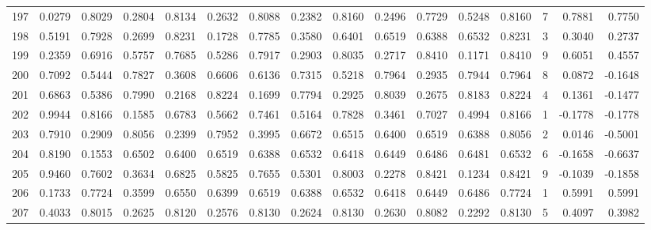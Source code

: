 \begin{tabular}{lrrrrrrrrrrrrrrr}
197 &      0.0279 &  0.8029 &  0.2804 &  0.8134 &  0.2632 &  0.8088 &  0.2382 &  0.8160 &  0.2496 &  0.7729 &   0.5248 &     0.8160 &      7 &                    0.7881 &                     0.7750 \\
198 &      0.5191 &  0.7928 &  0.2699 &  0.8231 &  0.1728 &  0.7785 &  0.3580 &  0.6401 &  0.6519 &  0.6388 &   0.6532 &     0.8231 &      3 &                    0.3040 &                     0.2737 \\
199 &      0.2359 &  0.6916 &  0.5757 &  0.7685 &  0.5286 &  0.7917 &  0.2903 &  0.8035 &  0.2717 &  0.8410 &   0.1171 &     0.8410 &      9 &                    0.6051 &                     0.4557 \\
200 &      0.7092 &  0.5444 &  0.7827 &  0.3608 &  0.6606 &  0.6136 &  0.7315 &  0.5218 &  0.7964 &  0.2935 &   0.7944 &     0.7964 &      8 &                    0.0872 &                    -0.1648 \\
201 &      0.6863 &  0.5386 &  0.7990 &  0.2168 &  0.8224 &  0.1699 &  0.7794 &  0.2925 &  0.8039 &  0.2675 &   0.8183 &     0.8224 &      4 &                    0.1361 &                    -0.1477 \\
202 &      0.9944 &  0.8166 &  0.1585 &  0.6783 &  0.5662 &  0.7461 &  0.5164 &  0.7828 &  0.3461 &  0.7027 &   0.4994 &     0.8166 &      1 &                   -0.1778 &                    -0.1778 \\
203 &      0.7910 &  0.2909 &  0.8056 &  0.2399 &  0.7952 &  0.3995 &  0.6672 &  0.6515 &  0.6400 &  0.6519 &   0.6388 &     0.8056 &      2 &                    0.0146 &                    -0.5001 \\
204 &      0.8190 &  0.1553 &  0.6502 &  0.6400 &  0.6519 &  0.6388 &  0.6532 &  0.6418 &  0.6449 &  0.6486 &   0.6481 &     0.6532 &      6 &                   -0.1658 &                    -0.6637 \\
205 &      0.9460 &  0.7602 &  0.3634 &  0.6825 &  0.5825 &  0.7655 &  0.5301 &  0.8003 &  0.2278 &  0.8421 &   0.1234 &     0.8421 &      9 &                   -0.1039 &                    -0.1858 \\
206 &      0.1733 &  0.7724 &  0.3599 &  0.6550 &  0.6399 &  0.6519 &  0.6388 &  0.6532 &  0.6418 &  0.6449 &   0.6486 &     0.7724 &      1 &                    0.5991 &                     0.5991 \\
207 &      0.4033 &  0.8015 &  0.2625 &  0.8120 &  0.2576 &  0.8130 &  0.2624 &  0.8130 &  0.2630 &  0.8082 &   0.2292 &     0.8130 &      5 &                    0.4097 &                     0.3982 \\

\end{tabular}
